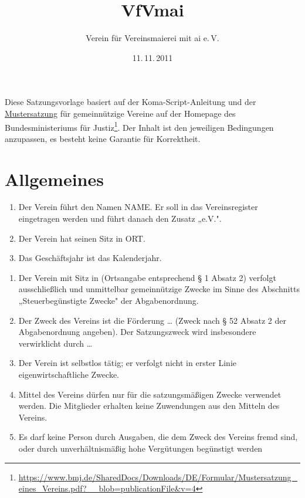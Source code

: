 \documentclass{scrartcl}
\begin{document}
\subject{Satzung}
\title{VfVmai}
\subtitle{Verein für Vereinsmaierei mit ai e.\,V.}
\date{11.\,11.\,2011}
\author{}
\maketitle

\tableofcontents

Diese Satzungsvorlage basiert auf der Koma-Script-Anleitung und der \href{https://www.bmj.de/SharedDocs/Downloads/DE/Formular/Mustersatzung_eines_Vereins.pdf?__blob=publicationFile&v=4}{Mustersatzung} für gemeinnützige Vereine auf der Homepage des Bundesministeriums für Justiz\footnote{\url{https://www.bmj.de/SharedDocs/Downloads/DE/Formular/Mustersatzung_eines_Vereins.pdf?__blob=publicationFile&v=4}}. Der Inhalt ist den jeweiligen Bedingungen anzupassen, es besteht keine Garantie für Korrektheit.


\appendix %

\section{Allgemeines}
\begin{contract}
\begin{enumerate}
    \item Der Verein führt den Namen NAME. Er soll in das Vereinsregister eingetragen werden und führt danach den Zusatz „e.V.".
    \item Der Verein hat seinen Sitz in ORT.
    \item Das Geschäftsjahr ist das Kalenderjahr.
\end{enumerate} 

\begin{enumerate}
    \item Der Verein mit Sitz in (Ortsangabe entsprechend § 1 Absatz 2) verfolgt ausschließlich und unmittelbar gemeinnützige Zwecke im Sinne des Abschnitts „Steuerbegünstigte Zwecke" der Abgabenordnung.
    \item Der Zweck des Vereins ist die Förderung … (Zweck nach § 52 Absatz 2 der Abgabenordnung angeben). Der Satzungszweck wird insbesondere verwirklicht durch …
    \item Der Verein ist selbstlos tätig; er verfolgt nicht in erster Linie eigenwirtschaftliche Zwecke.
    \item Mittel des Vereins dürfen nur für die satzungsmäßigen Zwecke verwendet werden. Die Mitglieder erhalten keine Zuwendungen aus den Mitteln des Vereins.
    \item Es darf keine Person durch Ausgaben, die dem Zweck des Vereins fremd sind, oder durch unverhältnismäßig hohe Vergütungen begünstigt werden
\end{enumerate}

\end{contract}
\end{document}
